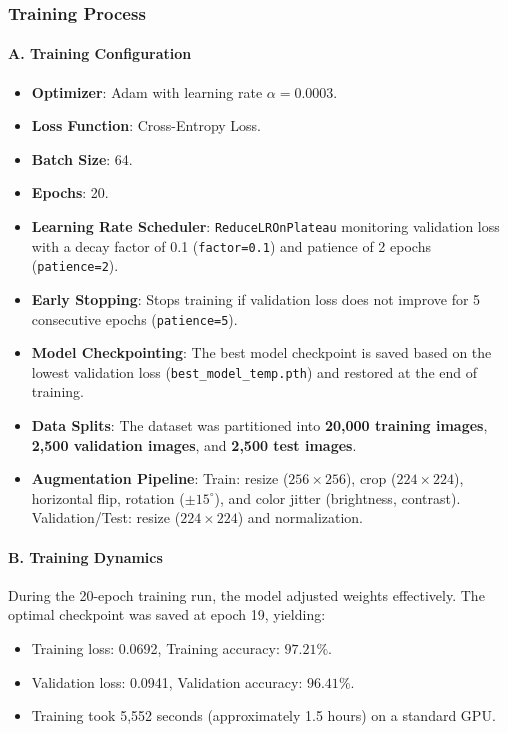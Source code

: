\documentclass[12pt,a4paper]{article}
\begin{document}
\subsubsection{Training Process}

\paragraph{A. Training Configuration}
\begin{itemize}
    \item \textbf{Optimizer}: Adam with learning rate $\alpha = 0.0003$.
    \item \textbf{Loss Function}: Cross-Entropy Loss.
    \item \textbf{Batch Size}: 64.
    \item \textbf{Epochs}: 20.
    \item \textbf{Learning Rate Scheduler}: \texttt{ReduceLROnPlateau} monitoring validation loss with a decay factor of 0.1 (\texttt{factor=0.1}) and patience of 2 epochs (\texttt{patience=2}).
    \item \textbf{Early Stopping}: Stops training if validation loss does not improve for 5 consecutive epochs (\texttt{patience=5}).
    \item \textbf{Model Checkpointing}: The best model checkpoint is saved based on the lowest validation loss (\texttt{best\_model\_temp.pth}) and restored at the end of training.
    \item \textbf{Data Splits}: The dataset was partitioned into \textbf{20,000 training images}, \textbf{2,500 validation images}, and \textbf{2,500 test images}.
    \item \textbf{Augmentation Pipeline}: Train: resize ($256 \times 256$), crop ($224 \times 224$), horizontal flip, rotation ($\pm 15^\circ$), and color jitter (brightness, contrast). Validation/Test: resize ($224 \times 224$) and normalization.
\end{itemize}

\paragraph{B. Training Dynamics}
During the 20-epoch training run, the model adjusted weights effectively. The optimal checkpoint was saved at epoch 19, yielding:
\begin{itemize}
    \item Training loss: 0.0692, Training accuracy: $97.21\%$.
    \item Validation loss: 0.0941, Validation accuracy: $96.41\%$.
    \item Training took 5,552 seconds (approximately 1.5 hours) on a standard GPU.
\end{itemize}
\end{document}
